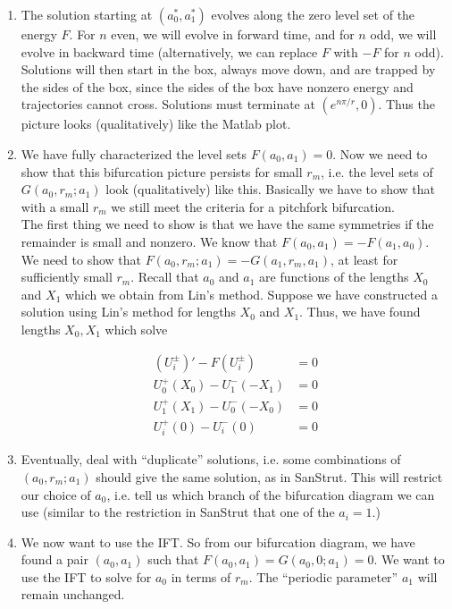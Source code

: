 \documentclass[12pt]{article}
\begin{document}
\begin{enumerate}
\item The solution starting at $(a_0^*, a_1^*)$ evolves along the zero level set of the energy $F$. For $n$ even, we will evolve in forward time, and for $n$ odd, we will evolve in backward time (alternatively, we can replace $F$ with $-F$ for $n$ odd). Solutions will then start in the box, always move down, and are trapped by the sides of the box, since the sides of the box have nonzero energy and trajectories cannot cross. Solutions must terminate at $(e^{n \pi/r}, 0)$. Thus the picture looks (qualitatively) like the Matlab plot.

\item We have fully characterized the level sets $F(a_0, a_1) = 0$. Now we need to show that this bifurcation picture persists for small $r_m$, i.e. the level sets of $G(a_0, r_m; a_1)$ look (qualitatively) like this. Basically we have to show that with a small $r_m$ we still meet the criteria for a pitchfork bifurcation.\\

The first thing we need to show is that we have the same symmetries if the remainder is small and nonzero. We know that $F(a_0, a_1) = -F(a_1, a_0)$. We need to show that $F(a_0, r_m; a_1) = -G(a_1, r_m, a_1)$, at least for sufficiently small $r_m$. Recall that $a_0$ and $a_1$ are functions of the lengths $X_0$ and $X_1$ which we obtain from Lin's method. Suppose we have constructed a solution using Lin's method for lengths $X_0$ and $X_1$. Thus, we have found lengths $X_0, X_1$ which solve

\begin{align}
(U_i^\pm)' - F(U_i^\pm) &= 0 \\
U_0^+(X_0) - U_{1}^-(-X_1) &= 0 \\
U_1^+(X_1) - U_{0}^-(-X_0) &= 0 \\
U_i^+(0) - U_i^-(0) &= 0
\end{align}

\item Eventually, deal with ``duplicate'' solutions, i.e. some combinations of $(a_0, r_m; a_1)$ should give the same solution, as in SanStrut. This will restrict our choice of $a_0$, i.e. tell us which branch of the bifurcation diagram we can use (similar to the restriction in SanStrut that one of the $a_i = 1$.)

\item We now want to use the IFT. So from our bifurcation diagram, we have found a pair $(a_0, a_1)$ such that $F(a_0, a_1) = G(a_0, 0; a_1)= 0$. We want to use the IFT to solve for $a_0$ in terms of $r_m$. The ``periodic parameter'' $a_1$ will remain unchanged.\\


\end{enumerate}
\end{document}
